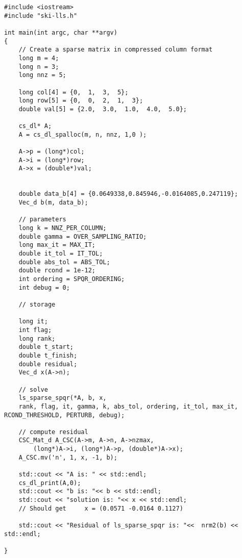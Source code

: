 \documentclass[english,11pt]{article}
\begin{document}
\begin{lstlisting}
#include <iostream>
#include "ski-lls.h"

int main(int argc, char **argv)
{
	// Create a sparse matrix in compressed column format
    long m = 4;
    long n = 3;
    long nnz = 5;

    long col[4] = {0,  1,  3,  5};
    long row[5] = {0,  0,  2,  1,  3}; 
    double val[5] = {2.0,  3.0,  1.0,  4.0,  5.0};

    cs_dl* A;
    A = cs_dl_spalloc(m, n, nnz, 1,0 );

    A->p = (long*)col;
    A->i = (long*)row;
    A->x = (double*)val;


    double data_b[4] = {0.0649338,0.845946,-0.0164085,0.247119};
    Vec_d b(m, data_b);

    // parameters
    long k = NNZ_PER_COLUMN;
    double gamma = OVER_SAMPLING_RATIO;
    long max_it = MAX_IT;
    double it_tol = IT_TOL;
    double abs_tol = ABS_TOL;
    double rcond = 1e-12;
    int ordering = SPQR_ORDERING;
    int debug = 0;

    // storage

    long it;
    int flag;
    long rank;
    double t_start;
    double t_finish;
    double residual;   
    Vec_d x(A->n);

    // solve
    ls_sparse_spqr(*A, b, x, 
    rank, flag, it, gamma, k, abs_tol, ordering, it_tol, max_it, RCOND_THRESHOLD, PERTURB, debug);

    // compute residual
    CSC_Mat_d A_CSC(A->m, A->n, A->nzmax, 
        (long*)A->i, (long*)A->p, (double*)A->x);
    A_CSC.mv('n', 1, x, -1, b);

    std::cout << "A is: " << std::endl;
    cs_dl_print(A,0);
    std::cout << "b is: "<< b << std::endl;
    std::cout << "solution is: "<< x << std::endl;
    // Should get     x = (0.0571 -0.0164 0.1127)

    std::cout << "Residual of ls_sparse_spqr is: "<<  nrm2(b) << std::endl;

}
\end{lstlisting}

 


\appendix
\end{document}
